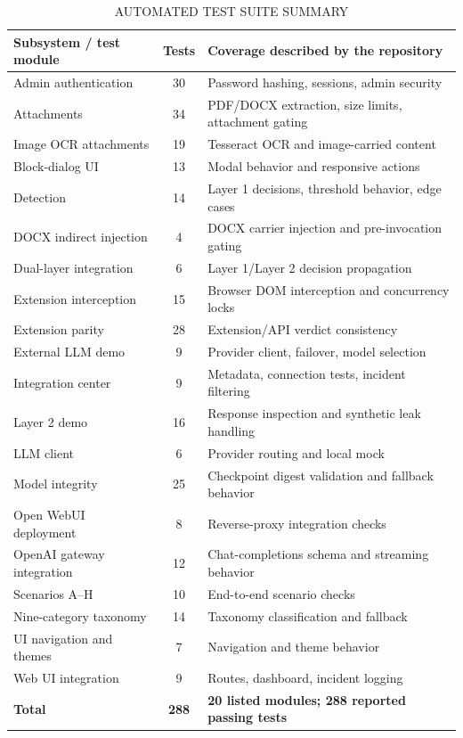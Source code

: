 \documentclass[conference]{IEEEtran}
\begin{document}
\begin{table}[t]
\caption{AUTOMATED TEST SUITE SUMMARY}
\label{tab:tests}
\centering
\begin{tabular}{lcp{4.2cm}}
\toprule
\textbf{Subsystem / test module} & \textbf{Tests} & \textbf{Coverage described by the repository} \\
\midrule
Admin authentication & 30 & Password hashing, sessions, admin security \\
Attachments & 34 & PDF/DOCX extraction, size limits, attachment gating \\
Image OCR attachments & 19 & Tesseract OCR and image-carried content \\
Block-dialog UI & 13 & Modal behavior and responsive actions \\
Detection & 14 & Layer 1 decisions, threshold behavior, edge cases \\
DOCX indirect injection & 4 & DOCX carrier injection and pre-invocation gating \\
Dual-layer integration & 6 & Layer 1/Layer 2 decision propagation \\
Extension interception & 15 & Browser DOM interception and concurrency locks \\
Extension parity & 28 & Extension/API verdict consistency \\
External LLM demo & 9 & Provider client, failover, model selection \\
Integration center & 9 & Metadata, connection tests, incident filtering \\
Layer 2 demo & 16 & Response inspection and synthetic leak handling \\
LLM client & 6 & Provider routing and local mock \\
Model integrity & 25 & Checkpoint digest validation and fallback behavior \\
Open WebUI deployment & 8 & Reverse-proxy integration checks \\
OpenAI gateway integration & 12 & Chat-completions schema and streaming behavior \\
Scenarios A--H & 10 & End-to-end scenario checks \\
Nine-category taxonomy & 14 & Taxonomy classification and fallback \\
UI navigation and themes & 7 & Navigation and theme behavior \\
Web UI integration & 9 & Routes, dashboard, incident logging \\
\midrule
\textbf{Total} & \textbf{288} & \textbf{20 listed modules; 288 reported passing tests} \\
\bottomrule
\end{tabular}
\end{table}
\end{document}

